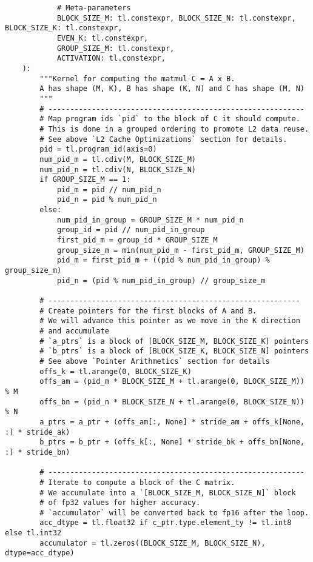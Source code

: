 \documentclass{article}
\begin{document}
\begin{lstlisting}
            # Meta-parameters
            BLOCK_SIZE_M: tl.constexpr, BLOCK_SIZE_N: tl.constexpr, BLOCK_SIZE_K: tl.constexpr,
            EVEN_K: tl.constexpr,
            GROUP_SIZE_M: tl.constexpr,
            ACTIVATION: tl.constexpr,
    ):
        """Kernel for computing the matmul C = A x B.
        A has shape (M, K), B has shape (K, N) and C has shape (M, N)
        """
        # -----------------------------------------------------------
        # Map program ids `pid` to the block of C it should compute.
        # This is done in a grouped ordering to promote L2 data reuse.
        # See above `L2 Cache Optimizations` section for details.
        pid = tl.program_id(axis=0)
        num_pid_m = tl.cdiv(M, BLOCK_SIZE_M)
        num_pid_n = tl.cdiv(N, BLOCK_SIZE_N)
        if GROUP_SIZE_M == 1:
            pid_m = pid // num_pid_n
            pid_n = pid % num_pid_n
        else:
            num_pid_in_group = GROUP_SIZE_M * num_pid_n
            group_id = pid // num_pid_in_group
            first_pid_m = group_id * GROUP_SIZE_M
            group_size_m = min(num_pid_m - first_pid_m, GROUP_SIZE_M)
            pid_m = first_pid_m + ((pid % num_pid_in_group) % group_size_m)
            pid_n = (pid % num_pid_in_group) // group_size_m

        # ----------------------------------------------------------
        # Create pointers for the first blocks of A and B.
        # We will advance this pointer as we move in the K direction
        # and accumulate
        # `a_ptrs` is a block of [BLOCK_SIZE_M, BLOCK_SIZE_K] pointers
        # `b_ptrs` is a block of [BLOCK_SIZE_K, BLOCK_SIZE_N] pointers
        # See above `Pointer Arithmetics` section for details
        offs_k = tl.arange(0, BLOCK_SIZE_K)
        offs_am = (pid_m * BLOCK_SIZE_M + tl.arange(0, BLOCK_SIZE_M)) % M
        offs_bn = (pid_n * BLOCK_SIZE_N + tl.arange(0, BLOCK_SIZE_N)) % N
        a_ptrs = a_ptr + (offs_am[:, None] * stride_am + offs_k[None, :] * stride_ak)
        b_ptrs = b_ptr + (offs_k[:, None] * stride_bk + offs_bn[None, :] * stride_bn)

        # -----------------------------------------------------------
        # Iterate to compute a block of the C matrix.
        # We accumulate into a `[BLOCK_SIZE_M, BLOCK_SIZE_N]` block
        # of fp32 values for higher accuracy.
        # `accumulator` will be converted back to fp16 after the loop.
        acc_dtype = tl.float32 if c_ptr.type.element_ty != tl.int8 else tl.int32
        accumulator = tl.zeros((BLOCK_SIZE_M, BLOCK_SIZE_N), dtype=acc_dtype)


\end{lstlisting}
\end{document}

